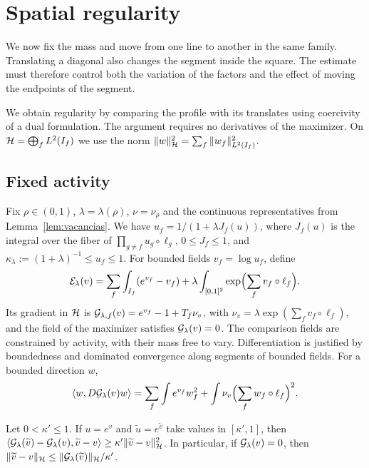 \section{Spatial regularity}\label{sec:regularidad}

We now fix the mass and move from one line to another in the same family. Translating a diagonal also changes the segment inside the
square. The estimate must therefore control both the variation of the factors and the effect of moving the endpoints of the segment.

We obtain regularity by comparing the profile with its translates using coercivity of a dual formulation. The argument requires no
derivatives of the maximizer. On ${\mathcal{H}}=\bigoplus_fL^2(I_f)$ we use the norm $\|w\|_{\mathcal{H}}^2=\sum_f\|w_f\|_{L^2(I_f)}^2$.

\subsection{Fixed activity}

Fix $\rho\in(0,1)$, $\lambda=\lambda(\rho)$, $\nu=\nu_\rho$ and the continuous representatives from Lemma~\ref{lem:vacancias}. We have
$u_f=1/(1+\lambda J_f(u))$, where $J_f(u)$ is the integral over the fiber of $\prod_{g\ne f}u_g\circ\ell_g$, $0\le J_f\le1$, and
$\kappa_\lambda:=(1+\lambda)^{-1}\le u_f\le1$. For bounded fields $v_f=\log u_f$, define \begin{equation}\label{eq:dual}
 {\mathcal{E}}_\lambda(v)=\sum_f\int_{I_f}(e^{v_f}-v_f)+\lambda\int_{[0,1]^2}\exp\Bigl(\sum_fv_f\circ\ell_f\Bigr).
\end{equation} Its gradient in ${\mathcal{H}}$ is ${\mathcal{G}}_{\lambda,f}(v)=e^{v_f}-1+T_f\nu_v$, with $\nu_v=\lambda\exp(\sum_fv_f\circ\ell_f)$, and
the field of the maximizer satisfies ${\mathcal{G}}_\lambda(v)=0$. The comparison fields are constrained by activity, with their mass free to
vary. Differentiation is justified by boundedness and dominated convergence along segments of bounded fields. For a bounded direction
$w$, \begin{equation}\label{eq:hess}
 \langle w,D{\mathcal{G}}_\lambda(v)w\rangle=\sum_f\int e^{v_f}w_f^2+\int\nu_v\Bigl(\sum_fw_f\circ\ell_f\Bigr)^2 .
\end{equation}

\begin{lema}[Stability]\label{lem:estabilidad} Let $0<\kappa'\le1$. If $u=e^v$ and $\widetilde u=e^{\widetilde v}$ take values in
$[\kappa',1]$, then $\langle{\mathcal{G}}_\lambda(\widetilde v)-{\mathcal{G}}_\lambda(v),\widetilde v-v\rangle\ge\kappa'\|\widetilde v-v\|_{\mathcal{H}}^2$. In
particular, if ${\mathcal{G}}_\lambda(v)=0$, then $\|\widetilde v-v\|_{\mathcal{H}}\le\|{\mathcal{G}}_\lambda(\widetilde v)\|_{\mathcal{H}}/\kappa'$. \end{lema}

